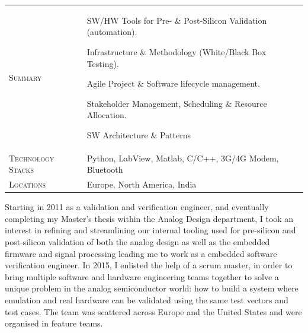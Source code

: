 \documentclass[10pt,a4paper]{moderncv}
\begin{document}
    \begin{tabularx}{\textwidth}{>{\scshape}l@{\hskip 3.5mm}L}
        Summary & SW/HW Tools for Pre- \& Post-Silicon Validation (automation).
        \par Infrastructure \& Methodology (White/Black Box Testing).
        \par Agile Project \& Software lifecycle management. 
        \par Stakeholder Management, Scheduling \& Resource Allocation.
        \par SW Architecture \& Patterns\\
        Technology Stacks & Python, LabView, Matlab, C/C++, 3G/4G Modem, Bluetooth\\
        Locations & Europe, North America, India\\
    \end{tabularx}

    \vspace{1.5em}

    Starting in 2011 as a validation and verification engineer, and eventually completing my Master's thesis within the Analog Design department, I took an interest in refining and streamlining our internal tooling used for pre-silicon and post-silicon validation of both the analog design as well as the embedded firmware and signal processing leading me to work as a embedded software verification engineer. In 2015, I enlisted the help of a scrum master, in order to bring multiple software and hardware engineering teams together to solve a unique problem in the analog semiconductor world: how to build a system where emulation and real hardware can be validated using the same test vectors and test cases. The team was scattered across Europe and the United States and were organised in feature teams.
\end{document}
